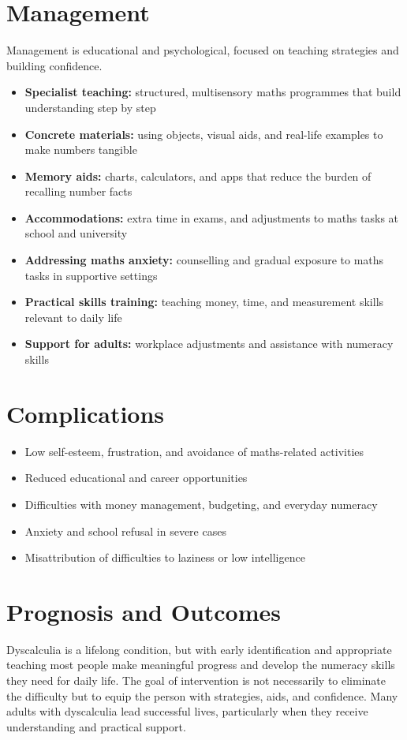\section*{Management}
Management is educational and psychological, focused on teaching strategies and building confidence.
\begin{itemize}
    \item \textbf{Specialist teaching:} structured, multisensory maths programmes that build understanding step by step
    \item \textbf{Concrete materials:} using objects, visual aids, and real-life examples to make numbers tangible
    \item \textbf{Memory aids:} charts, calculators, and apps that reduce the burden of recalling number facts
    \item \textbf{Accommodations:} extra time in exams, and adjustments to maths tasks at school and university
    \item \textbf{Addressing maths anxiety:} counselling and gradual exposure to maths tasks in supportive settings
    \item \textbf{Practical skills training:} teaching money, time, and measurement skills relevant to daily life
    \item \textbf{Support for adults:} workplace adjustments and assistance with numeracy skills
\end{itemize}

\section*{Complications}
\begin{itemize}
    \item Low self-esteem, frustration, and avoidance of maths-related activities
    \item Reduced educational and career opportunities
    \item Difficulties with money management, budgeting, and everyday numeracy
    \item Anxiety and school refusal in severe cases
    \item Misattribution of difficulties to laziness or low intelligence
\end{itemize}

\section*{Prognosis and Outcomes}
Dyscalculia is a lifelong condition, but with early identification and appropriate teaching most people make meaningful progress and develop the numeracy skills they need for daily life. The goal of intervention is not necessarily to eliminate the difficulty but to equip the person with strategies, aids, and confidence. Many adults with dyscalculia lead successful lives, particularly when they receive understanding and practical support.


